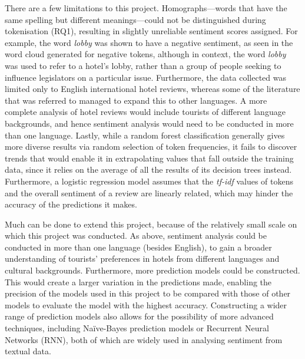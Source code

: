 \documentclass[12pt, bibliography=totocnumbered, paper=a4]{scrartcl}
\def\it#1{\textit{#1}}
\begin{document}
There are a few limitations to this project. Homographs---words that have the same spelling
but different meanings---could not be distinguished during tokenisation (RQ1), resulting in
slightly unreliable sentiment scores assigned. For example, the word \it{lobby} was shown to
have a negative sentiment, as seen in the word cloud generated for negative tokens, although
in context, the word \it{lobby} was used to refer to a hotel's lobby, rather than a group of
people seeking to influence legislators on a particular issue. Furthermore, the data collected
was limited only to English international hotel reviews, whereas some of the literature that was
referred to managed to expand this to other languages. A more complete analysis of hotel reviews
would include tourists of different language backgrounds, and hence sentiment analysis would need
to be conducted in more than one language. Lastly, while a random forest classification generally
gives more diverse results via random selection of token frequencies, it fails to discover trends
that would enable it in extrapolating values that fall outside the training data,
since it relies on the average of all the results of its decision trees instead. Furthermore,
a logistic regression model assumes that the \it{tf-idf} values of tokens and the overall sentiment
of a review are linearly related, which may hinder the accuracy of the predictions it makes.

Much can be done to extend this project, because of the relatively small scale on which this project
was conducted. As above, sentiment analysis could be conducted in more than one language (besides English),
to gain a broader understanding of tourists' preferences in hotels from different languages and cultural
backgrounds. Furthermore, more prediction models could be constructed. This would create a larger
variation in the predictions made, enabling the precision of the models used in this project to be
compared with those of other models to evaluate the model with the highest accuracy. Constructing a
wider range of prediction models also allows for the possibility of more advanced techniques,
including Naïve-Bayes prediction models or Recurrent Neural Networks (RNN), both of which are
widely used in analysing sentiment from textual data.

\printbibliography
\end{document}
